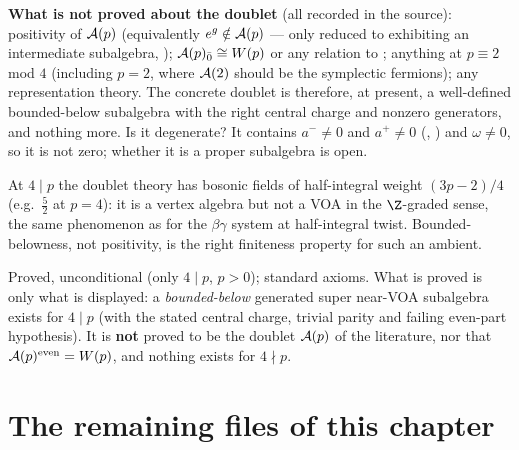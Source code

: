 \begin{warning}
\textbf{What is not proved about the doublet} (all recorded in the source): positivity of $\mathcal{A}(p)$ (equivalently
$e^{g}\notin\mathcal{A}(p)$ --- only reduced to exhibiting an intermediate subalgebra,
); $\mathcal{A}(p)_{\bar0}\cong W(p)$ or any relation to ;
anything at $p\equiv2$ mod $4$ (including $p=2$, where $\mathcal{A}(2)$ should be the symplectic fermions); any
representation theory. The concrete doublet is therefore, at present, a well-defined bounded-below subalgebra with the
right central charge and nonzero generators, and nothing more. Is it degenerate? It contains $a^-\ne0$ and $a^+\ne0$
(, ) and $\omega\ne0$, so it is not zero; whether it is a proper subalgebra is
open.
\end{warning}
\begin{physics}
At $4\mid p$ the doublet theory has bosonic fields of half-integral weight $(3p-2)/4$ (e.g.\ $\frac52$ at $p=4$): it is a
vertex algebra but not a VOA in the $\Z$-graded sense, the same phenomenon as for the $\beta\gamma$ system at
half-integral twist. Bounded-belowness, not positivity, is the right finiteness property for such an ambient.
\end{physics}
\begin{status}
Proved, unconditional (only $4\mid p$, $p>0$); standard axioms. What is proved is only what is displayed: a \emph{bounded-below}
generated super near-VOA subalgebra exists for $4\mid p$ (with the stated central charge, trivial parity and failing even-part
hypothesis). It is \textbf{not} proved to be the doublet $\mathcal{A}(p)$ of the literature, nor that
$\mathcal{A}(p)^{\mathrm{even}}=W(p)$, and nothing exists for $4\nmid p$.
\end{status}

\section{The remaining files of this chapter}\label{l18:sec:others}

